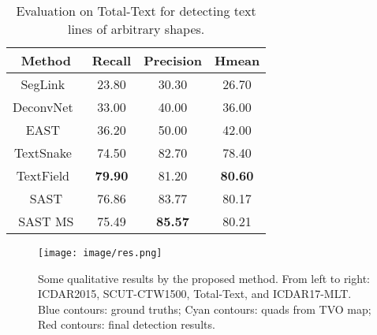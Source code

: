 \documentclass[sigconf]{acmart}
\begin{document}
\begin{table}
  \caption{Evaluation on Total-Text for detecting text lines of arbitrary shapes.}
  \label{tab:ex_total_text}
  \begin{tabular}{cccc}
    \toprule
      Method & Recall & Precision & Hmean\\
    \midrule
    SegLink~\cite{shi2017detecting} &23.80 &30.30 &26.70 \\
    DeconvNet~\cite{ch2017total} &33.00 &40.00 &36.00 \\
    EAST~\cite{zhou2017east} &36.20 &50.00 &42.00 \\
    TextSnake~\cite{long2018textsnake} &74.50 &82.70 &78.40 \\
    TextField~\cite{xu2019textfield} &\textbf{79.90} &81.20 &\textbf{80.60} \\


    \midrule
    SAST     &76.86 	&83.77 	&80.17  \\
    SAST MS  &75.49 	&\textbf{85.57} 	&80.21  \\


  \bottomrule
\end{tabular}
\end{table}


\begin{figure*}
  \texttt{[image: image/res.png]}
  \caption{Some qualitative results by the proposed method. From left to right:  ICDAR2015, SCUT-CTW1500, Total-Text, and ICDAR17-MLT. Blue contours: ground truths; Cyan contours: quads from TVO map; Red contours: final detection results. }
  \label{fig:res}
\end{figure*}
\end{document}
